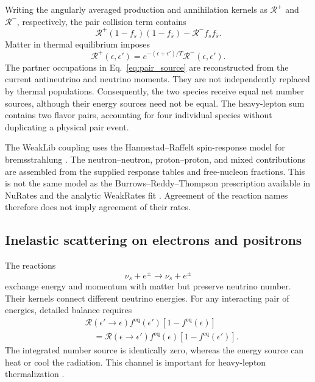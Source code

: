 \documentclass[aps,prd,reprint,nofootinbib,notitlepage]{revtex4-2}
\newcommand{\eq}{\mathrm{eq}}
\begin{document}
Writing the angularly averaged production and annihilation kernels as
$\mathcal R^+$ and $\mathcal R^-$, respectively, the pair collision term
contains
\begin{equation}
 \mathcal R^+(1-f_s)(1-f_{\bar s})
       -\mathcal R^- f_s f_{\bar s}.
 \label{eq:pair_source}
\end{equation}
Matter in thermal equilibrium imposes
\begin{equation}
 \mathcal R^+(\epsilon,\epsilon')
    =e^{-(\epsilon+\epsilon')/T}
       \mathcal R^-(\epsilon,\epsilon').
 \label{eq:pair_balance}
\end{equation}
The partner occupations in Eq.~\eqref{eq:pair_source} are reconstructed from
the current antineutrino and neutrino moments. They are not independently
replaced by thermal populations. Consequently, the two species receive
equal net number sources, although their energy sources need not be equal.
The heavy-lepton sum contains two flavor pairs, accounting for four
individual species without duplicating a physical pair event.

The WeakLib coupling uses the Hannestad--Raffelt spin-response model for
bremsstrahlung \cite{HannestadRaffelt1998}. The neutron--neutron,
proton--proton, and mixed contributions are assembled from the supplied
response tables and free-nucleon fractions. This is not the same model as
the Burrows--Reddy--Thompson prescription available in NuRates and the
analytic WeakRates fit \cite{Burrows2006}. Agreement of the reaction names
therefore does not imply agreement of their rates.

\subsection{Inelastic scattering on electrons and positrons}

The reactions
\begin{equation}
 \nu_s+e^\pm\longrightarrow\nu_s+e^\pm
\end{equation}
exchange energy and momentum with matter but preserve neutrino number.
Their kernels connect different neutrino energies. For any interacting
pair of energies, detailed balance requires
\begin{align}
 &\mathcal R(\epsilon'\!\to\epsilon)
       f^{\eq}(\epsilon')[1-f^{\eq}(\epsilon)]\nonumber\\
 &\hspace{1em}=\mathcal R(\epsilon\!\to\epsilon')
       f^{\eq}(\epsilon)[1-f^{\eq}(\epsilon')].
\end{align}
The integrated number source is identically zero, whereas the energy
source can heat or cool the radiation. This channel is important for
heavy-lepton thermalization \cite{Chiesa2025}.
\end{document}
